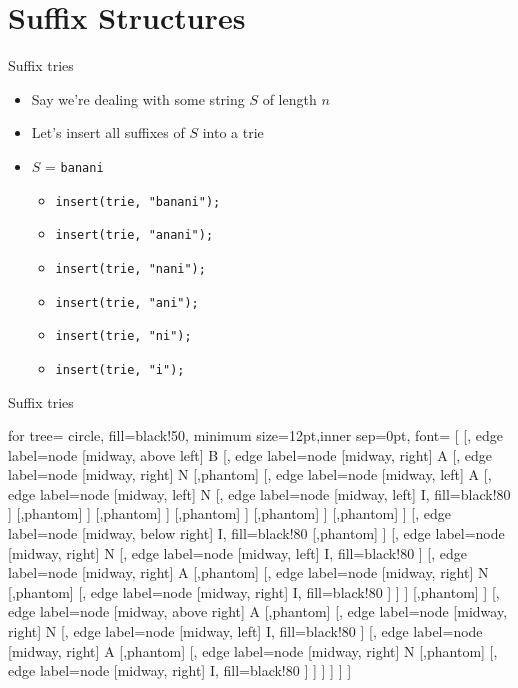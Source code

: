 \documentclass{beamer}
\begin{document}
\section*{Suffix Structures}	

\begin{frame}{Suffix tries}
	\begin{itemize}
		\item Say we're dealing with some string $S$ of length $n$
		\vspace{10pt}
		\item Let's insert all suffixes of $S$ into a trie
		\vspace{10pt}
		\item $S$ = \texttt{banani}
		\begin{itemize}
			\item \texttt{insert(trie, "banani");}
			\item \texttt{insert(trie, "anani");}
			\item \texttt{insert(trie, "nani");}
			\item \texttt{insert(trie, "ani");}
			\item \texttt{insert(trie, "ni");}
			\item \texttt{insert(trie, "i");}
		\end{itemize}
	\end{itemize}
\end{frame}


\begin{frame}[fragile]{Suffix tries}
	
	\begin{center}
		\begin{forest}
			for tree={
				circle,
				fill=black!50,
				minimum size=12pt,inner sep=0pt, font=\tiny
			}
			[{}
			[{}, edge label={node [midway, above left] {B}}
			[{}, edge label={node [midway, right] {A}}
			[{}, edge label={node [midway, right] {N}}
			[,phantom]
			[{}, edge label={node [midway, left] {A}}
			[{}, edge label={node [midway, left] {N}}
			[{}, edge label={node [midway, left] {I}}, fill=black!80
			]
			[,phantom]
			]
			[,phantom]
			]
			[,phantom]
			]
			[,phantom]
			]
			[,phantom]
			]
			[{}, edge label={node [midway, below right] {I}}, fill=black!80
			[,phantom]
			]
			[{}, edge label={node [midway, right] {N}}
			[{}, edge label={node [midway, left] {I}}, fill=black!80
			]
			[{}, edge label={node [midway, right] {A}}
			[,phantom]
			[{}, edge label={node [midway, right] {N}}
			[,phantom]
			[{}, edge label={node [midway, right] {I}}, fill=black!80
			]
			]
			]
			[,phantom]
			]
			[{}, edge label={node [midway, above right] {A}}
			[,phantom]
			[{}, edge label={node [midway, right] {N}}
			[{}, edge label={node [midway, left] {I}}, fill=black!80 ]
			[{}, edge label={node [midway, right] {A}}
			[,phantom]
			[{}, edge label={node [midway, right] {N}}
			[,phantom]
			[{}, edge label={node [midway, right] {I}}, fill=black!80
			]
			]
			]
			]
			]
			]
		\end{forest}
	\end{center}
\end{frame}
\end{document}
